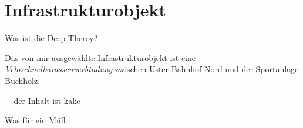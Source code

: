 %
%
%
%

\chapter{Infrastrukturobjekt}
\label{chap:Infra.o}

Was ist die Deep Theroy?

Das von mir ausgewählte Infrastrukturobjekt ist eine \textit{Veloschnellstrassenverbindung} zwischen Uster Bahnhof Nord und der Sportanlage Buchholz.

+ der Inhalt ist kake

\blindtext \newline

Was für ein Müll


%

